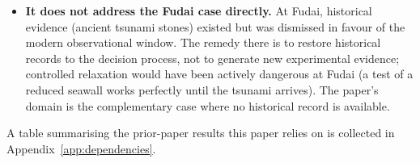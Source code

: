 \begin{itemize}
\item
\textbf{It does not address the Fudai case directly.}  At Fudai,
historical evidence (ancient tsunami stones) existed but was
dismissed in favour of the modern observational window.  The
remedy there is to restore historical records to the decision
process, not to generate new experimental evidence; controlled
relaxation would have been actively dangerous at Fudai (a test
of a reduced seawall works perfectly until the tsunami arrives).
The paper's domain is the complementary case where no historical
record is available.
\end{itemize}

\noindent
A table summarising the prior-paper results this paper relies on
is collected in Appendix~\ref{app:dependencies}.
